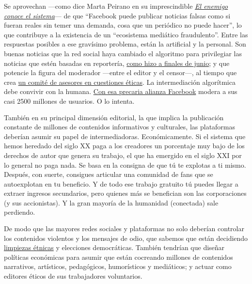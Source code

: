 Se aprovechan ---como dice Marta Peirano en su imprescindible
\href{https://www.megustaleer.com/libros/el-enemigo-conoce-el-sistema/MES-106841}{\emph{El
enemigo conoce el sistema}}--- de que ``Facebook puede publicar noticias
falsas como si fueran reales sin temer una demanda, cosa que un
periódico no puede hacer'', lo que contribuye a la existencia de un
``ecosistema mediático fraudulento''. Entre las respuestas posibles a
ese gravísimo problema, están la artificial y la personal. Son buenas
noticias que la red social haya cambiado el algoritmo para privilegiar
las noticias que estén basadas en reportería,
\href{https://fundaciongabo.org/es/etica-periodistica/noticias/facebook-cambia-su-algoritmo-para-favorecer-al-periodismo-con-reporteria}{como
hizo a finales de junio}; y que potencie la figura del moderador
---entre el editor y el censor---, al tiempo que crea
\href{https://www.nytimes3xbfgragh.onion/es/2020/05/06/espanol/opinion/facebook-junta-supervision.html}{un
comité de asesores en cuestiones éticas}. La intermediación algorítmica
debe convivir con la humana.
\href{https://www.nytimes3xbfgragh.onion/es/2018/12/28/espanol/facebook-moderadores.html}{Con
esa precaria alianza Facebook} modera a sus casi 2500 millones de
usuarios. O lo intenta.

También en su principal dimensión editorial, la que implica la
publicación constante de millones de contenidos informativos y
culturales, las plataformas deberían asumir su papel de intermediadoras.
Económicamente. Si el sistema que hemos heredado del siglo XX paga a los
creadores un porcentaje muy bajo de los derechos de autor que genera su
trabajo, el que ha emergido en el siglo XXI por lo general no paga nada.
Se basa en la consigna de que tú te explotas a ti mismo. Después, con
suerte, consigues articular una comunidad de fans que se autoexplotan en
tu beneficio. Y de todo ese trabajo gratuito tú puedes llegar a extraer
ingresos secundarios, pero quienes más se benefician son las
corporaciones (y sus accionistas). Y la gran mayoría de la humanidad
(conectada) sale perdiendo.

De modo que las mayores redes sociales y plataformas no solo deberían
controlar los contenidos violentos y los mensajes de odio, que sabemos
que están decidiendo
\href{https://www.nytimes3xbfgragh.onion/es/2018/10/18/espanol/facebook-violencia-rohinya-birmania.html}{limpiezas
étnicas} y elecciones democráticas. También tendrían que diseñar
políticas económicas para asumir que están cocreando millones de
contenidos narrativos, artísticos, pedagógicos, humorísticos y
mediáticos; y actuar como editores éticos de sus trabajadores
voluntarios.

